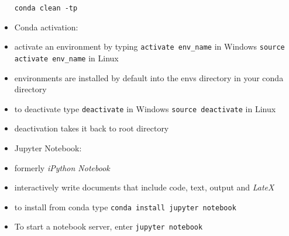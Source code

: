 \documentclass[onecolumn]{IEEEtran} %
\begin{document}
\begin{itemize}
        \newline \verb|conda clean -tp|
    \ei
    \item Conda activation:
    \bi
          \item activate an environment by typing \newline \verb|activate env_name| in Windows \newline  \verb|source activate env_name| in Linux
          \item environments are installed by default into the envs directory in your conda directory
          \item to deactivate type \newline \verb|deactivate| in Windows \newline  \verb|source deactivate| in Linux
          \bi
            \item deactivation takes it back to root directory
          \ei
    \ei
    \item Jupyter Notebook:
    \bi
        \item formerly \emph{iPython Notebook}
        \item interactively write documents that include code, text, output and \emph{LateX}
        \item to install from conda type \newline
        \verb|conda install jupyter notebook|
        \item To start a notebook server, enter \newline
        \verb|jupyter notebook|
    \ei
\end{itemize}
\end{document}
